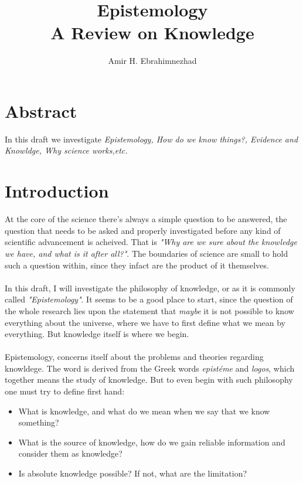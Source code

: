 \documentclass[9pt,a4paper,twocolumn]{article}
\title{Epistemology \\ \large A Review on Knowledge}
\author{Amir H. Ebrahimnezhad}
\date{}
\newcounter{theo}
\newcounter{def}
\begin{document}
        \maketitle
        \tableofcontents
        \section*{Abstract}
                In this draft we investigate \textit{Epistemology, How do we know things?, Evidence and Knowldge, Why science works,etc.}
        \section{Introduction}
            \indent At the core of the science there's always a simple question to be answered, the question that needs to be asked and properly investigated before any kind of scientific advancement is acheived. That is \textit{"Why are we sure about the knowledge we have, and what is it after all?"}. The boundaries of science are small to hold such a question within, since they infact are the product of it themselves.
            \\
            \\
            \indent In this draft, I will investigate the philosophy of knowledge, or as it is commonly called \textit{"Epistemology"}. It seems to be a good place to start, since the question of the whole research lies upon the statement that \textit{maybe} it is not possible to know everything about the universe, where we have to first define what we mean by everything. But knowledge itself is where we begin.
            \\
            \\
            \indent Epistemology, concerns itself about the problems and theories regarding knowldege. The word is derived from the Greek words \textit{epistéme} and \textit{logos}, which together means the study of knowledge. But to even begin with such philosophy one must try to define first hand:
            \begin{itemize}
                \item What is knowledge, and what do we mean when we say that we know something?
                \item What is the source of knowledge, how do we gain reliable information and consider them as knowledge?
                \item Is absolute knowledge possible? If not, what are the limitation?\cite{CW/E}
            \end{itemize}
\end{document}

